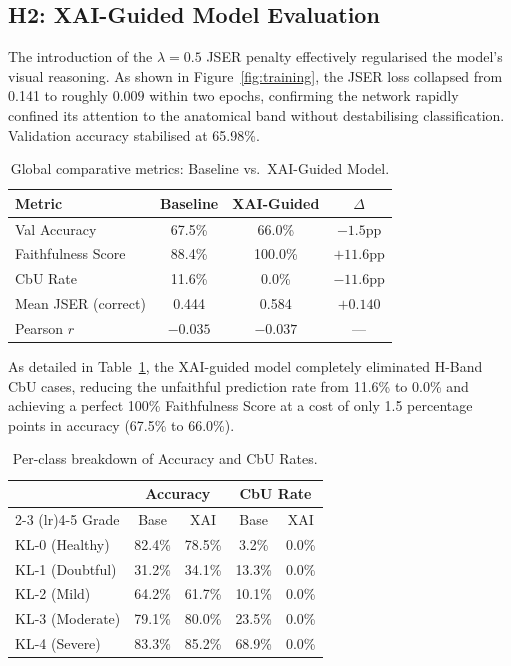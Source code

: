 \documentclass[conference]{IEEEtran}
\begin{document}
\subsection{H2: XAI-Guided Model Evaluation}

The introduction of the $\lambda=0.5$ JSER penalty effectively regularised the model's visual reasoning. As shown in Figure~\ref{fig:training}, the JSER loss collapsed from 0.141 to roughly $0.009$ within two epochs, confirming the network rapidly confined its attention to the anatomical band without destabilising classification. Validation accuracy stabilised at 65.98\%.

\begin{table}[htbp]
\centering
\caption{Global comparative metrics: Baseline vs.\ XAI-Guided Model.}
\label{tab:global}
\begin{tabular}{lccc}
\toprule
Metric & Baseline & XAI-Guided & $\Delta$ \\
\midrule
Val Accuracy        & 67.5\% & 66.0\% & $-1.5$pp \\
Faithfulness Score  & 88.4\% & 100.0\% & $+11.6$pp \\
CbU Rate            & 11.6\% & 0.0\%  & $-11.6$pp \\
Mean JSER (correct) & 0.444  & 0.584  & $+0.140$ \\
Pearson $r$         & $-0.035$ & $-0.037$ & --- \\
\bottomrule
\end{tabular}
\end{table}

As detailed in Table~\ref{tab:global}, the XAI-guided model completely eliminated H-Band CbU cases, reducing the unfaithful prediction rate from 11.6\% to 0.0\% and achieving a perfect 100\% Faithfulness Score at a cost of only 1.5 percentage points in accuracy (67.5\% to 66.0\%).

\begin{table}[htbp]
\centering
\caption{Per-class breakdown of Accuracy and CbU Rates.}
\label{tab:perclass}
\begin{tabular}{lcccc}
\toprule
 & \multicolumn{2}{c}{Accuracy} & \multicolumn{2}{c}{CbU Rate} \\
\cmidrule(lr){2-3} \cmidrule(lr){4-5}
Grade & Base & XAI & Base & XAI \\
\midrule
KL-0 (Healthy)   & 82.4\% & 78.5\% & 3.2\%  & 0.0\% \\
KL-1 (Doubtful)  & 31.2\% & 34.1\% & 13.3\% & 0.0\% \\
KL-2 (Mild)      & 64.2\% & 61.7\% & 10.1\% & 0.0\% \\
KL-3 (Moderate)  & 79.1\% & 80.0\% & 23.5\% & 0.0\% \\
KL-4 (Severe)    & 83.3\% & 85.2\% & 68.9\% & 0.0\% \\
\bottomrule
\end{tabular}
\end{table}
\end{document}
